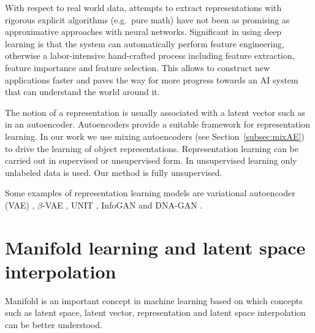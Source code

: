 \documentclass[a4paper,12pt]{report}
\begin{document}
With respect to real world data, attempts to extract representations with rigorous explicit algorithms (e.g.\ pure math) have not been as promising as approximative approaches with neural networks. Significant in using deep learning is that the system can automatically perform feature engineering, otherwise a labor-intensive hand-crafted process including feature extraction, feature importance and feature selection. This allows to construct new applications faster and paves the way for more progress towards an AI system that can understand the world around it.

The notion of a representation is usually associated with a latent vector such as in an autoencoder. Autoencoders provide a suitable framework for representation learning. In our work we use mixing autoencoders (see Section~\ref{subsec:mixAE}) to drive the learning of object representations. Representation learning can be carried out in supervised or unsupervised form. In unsupervised learning only unlabeled data is used. Our method is fully unsupervised.

Some examples of representation learning models are variational autoencoder (VAE) \cite{VAE}, $\beta$-VAE \cite{betaVAE}, UNIT \cite{UNIT}, InfoGAN \cite{InfoGAN} and DNA-GAN \cite{DnaGan}.



\section{Manifold learning and latent space interpolation}
Manifold is an important concept in machine learning based on which concepts such as latent space, latent vector, representation and latent space interpolation can be better understood. 
\end{document}
